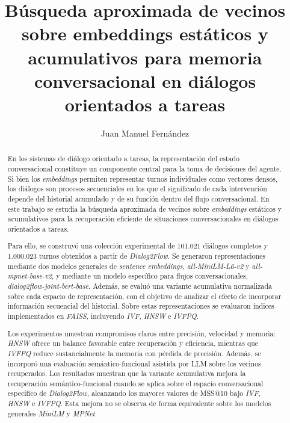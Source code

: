 \documentclass[runningheads]{llncs}
\begin{document}
\title{Búsqueda aproximada de vecinos sobre embeddings estáticos y acumulativos para memoria conversacional en diálogos orientados a tareas}


\author{Juan Manuel Fernández}

\maketitle

\begin{abstract}
En los sistemas de diálogo orientado a tareas, la representación del estado conversacional constituye un componente central para la toma de decisiones del agente. Si bien los \textit{embeddings} permiten representar turnos individuales como vectores densos, los diálogos son procesos secuenciales en los que el significado de cada intervención depende del historial acumulado y de su función dentro del flujo conversacional. En este trabajo se estudia la búsqueda aproximada de vecinos sobre \textit{embeddings} estáticos y acumulativos para la recuperación eficiente de situaciones conversacionales en diálogos orientados a tareas.

Para ello, se construyó una colección experimental de 101.021 diálogos completos y 1.000.023 turnos obtenidos a partir de \textit{Dialog2Flow}. Se generaron representaciones mediante dos modelos generales de \textit{sentence embeddings}, \textit{all-MiniLM-L6-v2} y \textit{all-mpnet-base-v2}, y mediante un modelo específico para flujos conversacionales, \textit{dialog2flow-joint-bert-base}. Además, se evaluó una variante acumulativa normalizada sobre cada espacio de representación, con el objetivo de analizar el efecto de incorporar información secuencial del historial. Sobre estas representaciones se evaluaron índices implementados en \textit{FAISS}, incluyendo \textit{IVF}, \textit{HNSW} e \textit{IVFPQ}.

Los experimentos muestran compromisos claros entre precisión, velocidad y memoria: \textit{HNSW} ofrece un balance favorable entre recuperación y eficiencia, mientras que \textit{IVFPQ} reduce sustancialmente la memoria con pérdida de precisión. Además, se incorporó una evaluación semántico-funcional asistida por LLM sobre los vecinos recuperados. Los resultados muestran que la variante acumulativa mejora la recuperación semántico-funcional cuando se aplica sobre el espacio conversacional específico de \textit{Dialog2Flow}, alcanzando los mayores valores de MSS@10 bajo \textit{IVF}, \textit{HNSW} e \textit{IVFPQ}. Esta mejora no se observa de forma equivalente sobre los modelos generales \textit{MiniLM} y \textit{MPNet}.


\end{abstract}
\end{document}
